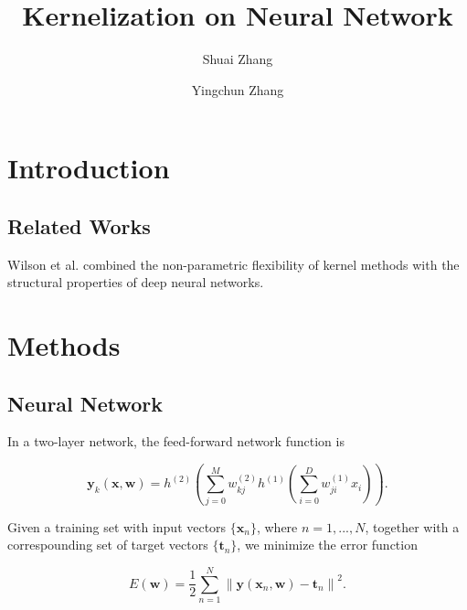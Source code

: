 \documentclass{article}
\begin{document}
\title{Kernelization on Neural Network}
\author{Shuai Zhang\and Yingchun Zhang}
\maketitle

\section{Introduction}

\subsection{Related Works}
Wilson et al. \cite{DBLP:journals/corr/WilsonHSX15} combined the non-parametric flexibility of kernel methods with the structural properties of deep neural networks.




\section{Methods}

\subsection{Neural Network}

In a two-layer network, the feed-forward network function is

\begin{equation}
\mathbf{y}_k(\mathbf{x}, \mathbf{w}) = h^{(2)}\left(\sum_{j=0}^{M}w_{kj}^{(2)}h^{(1)}\left(\sum_{i=0}^{D}w_{ji}^{(1)}x_i\right)\right).
\end{equation}

Given a training set with input vectors $\{\mathbf{x}_n\}$, where $n = 1, ..., N$, together with a correspounding set of target vectors $\{\mathbf{t}_n\}$, we minimize the error function

\begin{equation}
E(\mathbf{w}) = \frac{1}{2} \sum_{n=1}^{N} {\|\mathbf{y}(\mathbf{x}_n, \mathbf{w}) - \mathbf{t}_n\|}^2.
\end{equation}




\end{document}
